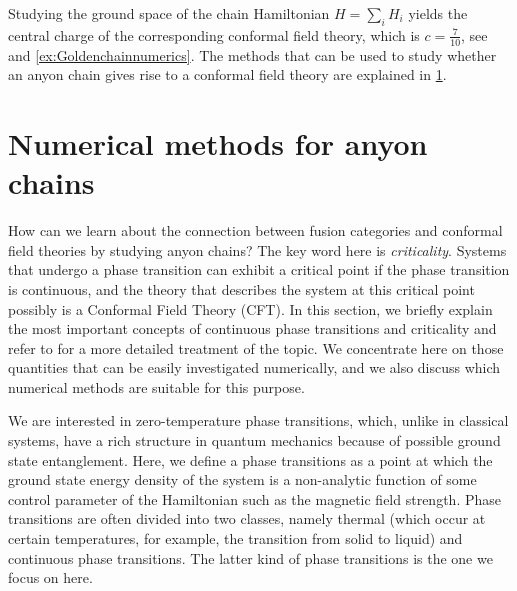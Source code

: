 \begin{exmp}
Studying the ground space of the chain Hamiltonian $H=\sum_i H_i$ yields the central charge of the corresponding conformal field theory, which is $c=\frac{7}{10}$, see \cite{feiguin_interacting_2007} and \cref{ex:Goldenchainnumerics}. The methods that can be used to study whether an anyon chain gives rise to a conformal field theory are explained in \cref{sec:numerics}.
\end{exmp}




\section{Numerical methods for anyon chains}
\label{sec:numerics}

How can we learn about the connection between fusion categories and conformal field theories by studying anyon chains? The key word here is \emph{criticality}. Systems that undergo a phase transition can exhibit a critical point if the phase transition is continuous, and the theory that describes the system at this critical point possibly is a Conformal Field Theory (CFT).
In this section, we briefly explain the most important concepts of continuous phase transitions and criticality and refer to \cite{Sachdev2017} for a more detailed treatment of the topic. We concentrate here on those quantities that can be easily investigated numerically, and we also discuss which numerical methods are suitable for this purpose.

We are interested in zero-temperature phase transitions, which, unlike in classical systems, have a rich structure in quantum mechanics because of possible ground state entanglement. Here, we define a phase transitions as a point at which the ground state energy density of the system is a non-analytic function of some control parameter of the Hamiltonian such as the magnetic field strength. Phase transitions are often divided into two classes, namely thermal (which occur at certain temperatures, for example, the transition from solid to liquid) and continuous phase transitions. The latter kind of phase transitions is the one we focus on here.

